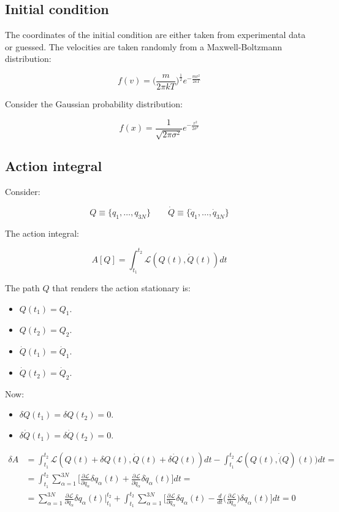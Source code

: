 	\subsection{Initial condition}
	The coordinates of the initial condition are either taken from experimental data or guessed.
	The velocities are taken randomly from a Maxwell-Boltzmann distribution:

	$$f(v) = \biggl(\frac{m}{2\pi kT}\biggr)^\frac{1}{2}e^{-\frac{mv^2}{2kT}}$$

	Consider the Gaussian probability distribution:

	$$f(x) = \frac{1}{\sqrt{2\pi\sigma^2}}e^{-\frac{x^2}{2\sigma^2}}$$

	\subsection{Action integral}
	Consider:

	$$Q \equiv\{q_1, \dots, q_{3N}\}\qquad \dot{Q}\equiv\{\dot{q}_1, \dots, \dot{q}_{3N}\}$$

	The action integral:

	$$A[Q] = \int_{t_1}^{t_2}\mathcal{L}(Q(t), \dot{Q}(t))dt$$

	The path $Q$ that renders the action stationary is:

	\begin{multicols}{4}
		\begin{itemize}
			\item $Q(t_1) = Q_1$.
			\item $Q(t_2) = Q_2$.
			\item $\dot{Q}(t_1) = \dot{Q}_1$.
			\item $\dot{Q}(t_2) = \dot{Q}_2$.
		\end{itemize}
	\end{multicols}

	Now:

	\begin{multicols}{2}
		\begin{itemize}
			\item $\delta Q(t_1) = \delta Q(t_2) = 0$.
			\item $\delta\dot{Q}(t_1) = \delta\dot{Q}(t_2) = 0$.
		\end{itemize}
	\end{multicols}

	\begin{align*}
		\delta A &= \int_{t_1}^{t_2}\mathcal{L}(Q(t) + \delta Q(t), \dot{Q}(t)+\delta\dot{Q}(t))dt - \int_{t_1}^{t_2}\mathcal{L}(Q(t), \dot(Q)(t))dt = \\
						 &=\int_{t_1}^{t_2}\sum\limits_{\alpha=1}^{3N}\biggl[\frac{\partial\mathcal{L}}{\partial q_\alpha}\delta q_\alpha(t) + \frac{\partial\mathcal{L}}{\partial\dot{q}_\alpha}\delta\dot{q}_\alpha(t)\biggr]dt=\\
						 &=\sum\limits_{\alpha=1}^{3N}\frac{\partial\mathcal{L}}{\partial\dot{q}_\alpha}\delta q_\alpha(t)|_{t_1}^{t_2} + \int_{t_1}^{t_2}\sum\limits_{\alpha=1}^{3N}\biggl[\frac{\partial\mathcal{L}}{\partial q_\alpha}\delta q_\alpha(t) - \frac{d}{dt}\biggl(\frac{\partial\mathcal{L}}{\partial\dot{q}_\alpha}\biggr)\delta q_\alpha(t)\biggr] dt = 0
	\end{align*}

